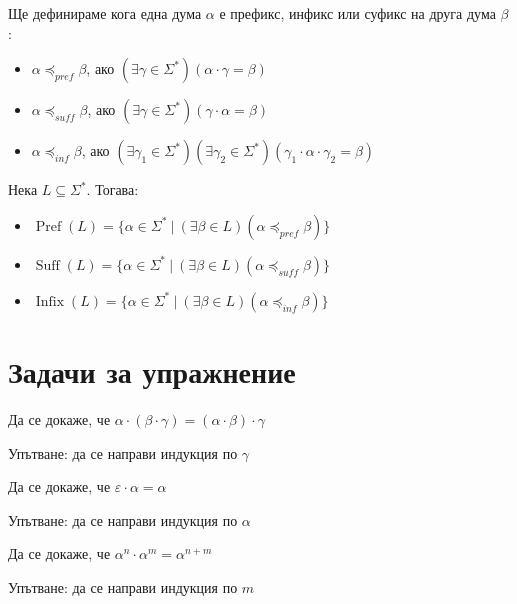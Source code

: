 \begin{definition}
    Ще дефинираме кога една дума $\alpha$ е префикс, инфикс или суфикс на друга дума $\beta$:
    \begin{itemize}
        \item $\alpha \preceq_{pref} \beta$, ако $(\exists \gamma \in \Sigma^*)(\alpha \cdot \gamma = \beta)$
        \item $\alpha \preceq_{suff} \beta$, ако $(\exists \gamma \in \Sigma^*)(\gamma \cdot \alpha = \beta)$
        \item $\alpha \preceq_{inf} \beta$, ако $(\exists \gamma_1 \in \Sigma^*)(\exists \gamma_2 \in \Sigma^*)(\gamma_1 \cdot \alpha \cdot \gamma_2 = \beta)$
    \end{itemize}
    Нека $L \subseteq \Sigma^*$. Тогава:
    \begin{itemize}
        \item $\operatorname{Pref}(L) = \{ \alpha \in \Sigma^* \: | \: (\exists \beta \in L)(\alpha \preceq_{pref} \beta) \}$
        \item $\operatorname{Suff}(L) = \{ \alpha \in \Sigma^* \: | \: (\exists \beta \in L)(\alpha \preceq_{suff} \beta) \}$
        \item $\operatorname{Infix}(L) = \{ \alpha \in \Sigma^* \: | \: (\exists \beta \in L)(\alpha \preceq_{inf} \beta) \}$
    \end{itemize}
\end{definition}

\pagebreak

\section{Задачи за упражнение}

\begin{problem}[асоциативност]
Да се докаже, че $\alpha \cdot (\beta \cdot \gamma) = (\alpha \cdot \beta) \cdot \gamma$

Упътване: да се направи индукция по $\gamma$
\end{problem}

\begin{problem}
Да се докаже, че $\varepsilon \cdot \alpha = \alpha$

Упътване: да се направи индукция по $\alpha$
\end{problem}

\begin{problem}
Да се докаже, че $\alpha^n \cdot \alpha^m = \alpha^{n + m}$

Упътване: да се направи индукция по $m$
\end{problem}


